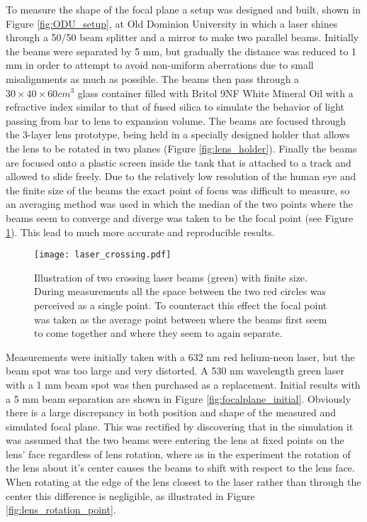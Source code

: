 To measure the shape of the focal plane a setup was designed and built, shown in Figure \ref{fig:ODU_setup}, at Old Dominion University in which a laser shines through a 50/50 beam splitter and a mirror to make two parallel beams. Initially the beams were separated by 5 mm, but gradually the distance was reduced to 1 mm in order to attempt to avoid non-uniform aberrations due to small misalignments as much as possible. The beams then pass through a $30\times40\times60\unit{cm}^3$ glass container filled with Britol 9NF White Mineral Oil \cite{BritolOil} with a refractive index similar to that of fused silica to simulate the behavior of light passing from bar to lens to expansion volume. The beams are focused through the 3-layer lens prototype, being held in a specially designed holder that allows the lens to be rotated in two planes (Figure \ref{fig:lens_holder}). Finally the beams are focused onto a plastic screen inside the tank that is attached to a track and allowed to slide freely. Due to the relatively low resolution of the human eye and the finite size of the beams the exact point of focus was difficult to measure, so an averaging method was used in which the median of the two points where the beams seem to converge and diverge was taken to be the focal point (see Figure \ref{fig:laser_crossing}). This lead to much more accurate and reproducible results.

\begin{figure}[!htb]
	\centering
	\texttt{[image: laser\_crossing.pdf]}
	\caption{Illustration of two crossing laser beams (green) with finite size. During measurements all the space between the two red circles was perceived as a single point. To counteract this effect the focal point was taken as the average point between where the beams first seem to come together and where they seem to again separate.}
	\label{fig:laser_crossing}
\end{figure}

Measurements were initially taken with a 632 nm red helium-neon laser, but the beam spot was too large and very distorted. A 530 nm wavelength green laser with a 1 mm beam spot was then purchased as a replacement. Initial results with a 5 mm beam separation are shown in Figure \ref{fig:focalplane_initial}. Obviously there is a large discrepancy in both position and shape of the measured and simulated focal plane. This was rectified by discovering that in the simulation it was assumed that the two beams were entering the lens at fixed points on the lens' face regardless of lens rotation, where as in the experiment the rotation of the lens about it's center causes the beams to shift with respect to the lens face. When rotating at the edge of the lens closest to the laser rather than through the center this difference is negligible, as illustrated in Figure \ref{fig:lens_rotation_point}.

